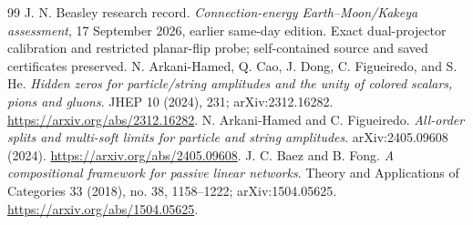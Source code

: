 \documentclass[11pt,letterpaper]{article}
\theoremstyle{definition}
\theoremstyle{remark}\newtheorem{remark}[theorem]{Remark}
\begin{document}
\begin{thebibliography}{99}
 J. N. Beasley research record. \emph{Connection-energy Earth--Moon/Kakeya assessment}, 17 September 2026, earlier same-day edition. Exact dual-projector calibration and restricted planar-flip probe; self-contained source and saved certificates preserved.
 N. Arkani-Hamed, Q. Cao, J. Dong, C. Figueiredo, and S. He. \emph{Hidden zeros for particle/string amplitudes and the unity of colored scalars, pions and gluons}. JHEP 10 (2024), 231; arXiv:2312.16282. \url{https://arxiv.org/abs/2312.16282}.
 N. Arkani-Hamed and C. Figueiredo. \emph{All-order splits and multi-soft limits for particle and string amplitudes}. arXiv:2405.09608 (2024). \url{https://arxiv.org/abs/2405.09608}.
 J. C. Baez and B. Fong. \emph{A compositional framework for passive linear networks}. Theory and Applications of Categories 33 (2018), no. 38, 1158--1222; arXiv:1504.05625. \url{https://arxiv.org/abs/1504.05625}.
\end{thebibliography}
\end{document}
